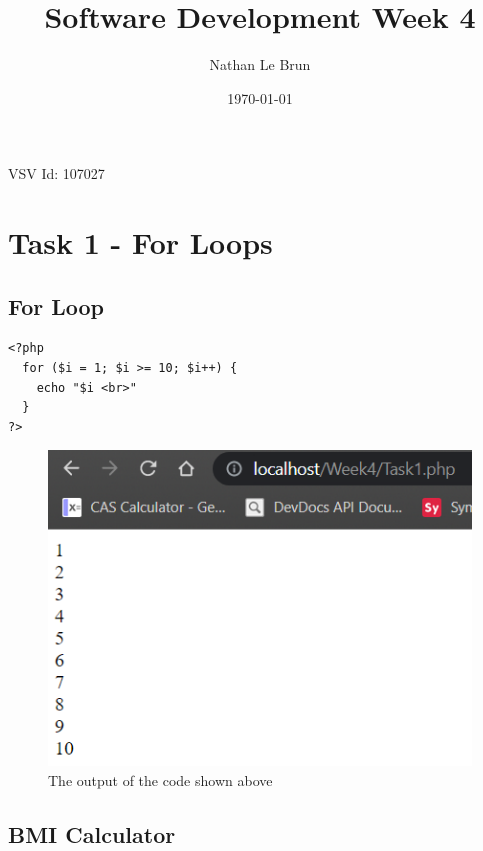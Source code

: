 \documentclass{article}
\title{Software Development Week 4}
\author{Nathan Le Brun}
\date{\today}
\begin{document}
    \maketitle
    VSV Id: 107027
    
    \section[Task 1]{Task 1 - For Loops}
        \subsection{For Loop}
            \begin{verbatim}
<?php
  for ($i = 1; $i >= 10; $i++) {
    echo "$i <br>"
  }
?>
            \end{verbatim}
            \begin{figure}[h]
                \centering
                \includegraphics{Task1A}
                \caption{The output of the code shown above}
            \end{figure}
        \subsection{BMI Calculator}
            
\end{document}
